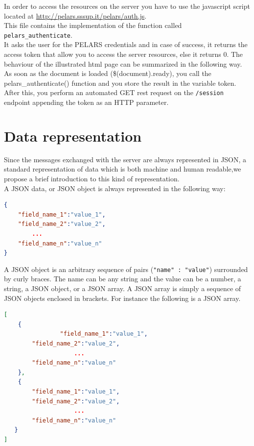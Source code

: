 \documentclass[a4paper,notitlepage,onecolumn]{hitec}  %
\begin{document}
In order to access the resources on the server you have to use the javascript script located at \url{http://pelars.sssup.it/pelars/auth.js}. \\
This file contains the implementation of the function called {\tt pelars\_authenticate}. \\
It asks the user for the PELARS credentials and in case of success, it returns the access token that allow you to access the server resources, else it returns 0. The behaviour of the illustrated html page can be summarized in the following way. \\
As soon as the document is loaded (\$(document).ready), you call the pelars\_authenticate() function and you store the result in the variable token. After this, you perform an automated GET rest request on the {\tt /session} endpoint appending the token as an HTTP parameter. 


\section{Data representation}
Since the messages exchanged with the server are always represented in \ac{JSON}, a standard representation of data which is both machine and human readable,we propose a brief introduction to this kind of representation.\\
A JSON data, or JSON object is always represented in the following way:

\begin{lstlisting}[language=json]
{  
	"field_name_1":"value_1",
	"field_name_2":"value_2",
		...
	"field_name_n":"value_n"
}
\end{lstlisting}
A JSON object is an arbitrary sequence of pairs ({\tt "name" : "value"}) surrounded by curly braces. The name can be any string and the value can be a number, a string, a JSON object, or a JSON array. 
A JSON array is simply a sequence of JSON objects enclosed in brackets. For instance the following is a JSON array.\\
\begin{lstlisting}[language=json] 
[  
	{  
				"field_name_1":"value_1",
      	"field_name_2":"value_2",
					...
      	"field_name_n":"value_n"
   	},
   	{  
      	"field_name_1":"value_1",
      	"field_name_2":"value_2",
					...
      	"field_name_n":"value_n"
   }
]
\end{lstlisting}
\end{document}
